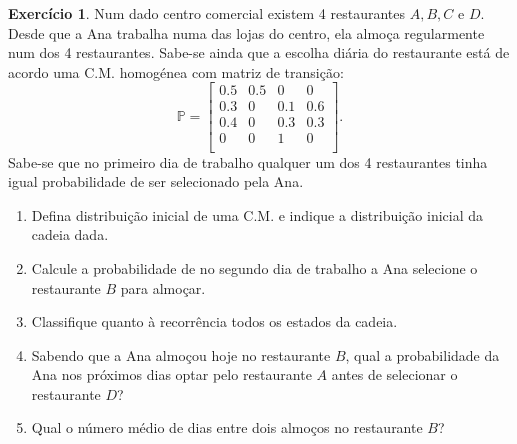 \documentclass[
  11pt,
  a4paper,
]{book}
\theoremstyle{definition}
\theoremstyle{definition}
\theoremstyle{definition}
\newtheorem{exercise}{Exercício}[chapter]
\theoremstyle{definition}
\theoremstyle{remark}
\begin{document}
\begin{exercise}

Num dado centro comercial existem 4 restaurantes \(A,B,C\) e \(D\). Desde que a Ana trabalha numa das lojas do centro, ela almoça regularmente num dos 4 restaurantes. Sabe-se ainda que a escolha diária do restaurante está de acordo uma C.M. homogénea com matriz de transição:
\[
\mathbb{P} =
\begin{bmatrix}
0.5 & 0.5 & 0 & 0   \\
0.3 & 0 & 0.1 & 0.6   \\
0.4 & 0 & 0.3 & 0.3   \\
0 & 0 & 1 & 0   \\
\end{bmatrix}.
\]
Sabe-se que no primeiro dia de trabalho qualquer um dos 4 restaurantes tinha igual probabilidade de ser selecionado pela Ana.

\begin{enumerate}
\def\labelenumi{(\alph{enumi})}
\item
  Defina distribuição inicial de uma C.M. e indique a distribuição inicial da cadeia dada.
\item
  Calcule a probabilidade de no segundo dia de trabalho a Ana selecione o restaurante \(B\) para almoçar.
\item
  Classifique quanto à recorrência todos os estados da cadeia.
\item
  Sabendo que a Ana almoçou hoje no restaurante \(B\), qual a probabilidade da Ana nos próximos dias optar pelo restaurante \(A\) antes de selecionar o restaurante \(D\)?
\item
  Qual o número médio de dias entre dois almoços no restaurante \(B\)?
\end{enumerate}

\end{exercise}

\(\,\)
\end{document}

